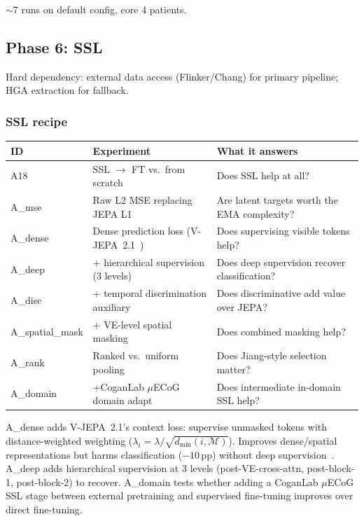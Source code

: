 \documentclass[11pt,letterpaper]{article}
\newcommand{\pp}{\,\text{pp}}
\begin{document}
${\sim}$7 runs on default config, core 4 patients.

\subsection{Phase 6: SSL}\label{sec:phase6}

\textcolor{BrickRed}{Hard dependency:} external data access (Flinker/Chang) for primary pipeline; HGA extraction for fallback.

\subsubsection{SSL recipe}

\begin{table}[ht!]\centering\small
\begin{tabular}{@{}llp{5.5cm}@{}}
\toprule
\textbf{ID} & \textbf{Experiment} & \textbf{What it answers} \\
\midrule
A18 & SSL $\to$ FT vs.\ from scratch & Does SSL help at all? \\
A\_mse & Raw L2 MSE replacing JEPA L1 & Are latent targets worth the EMA complexity? \\
A\_dense & Dense prediction loss (V-JEPA~2.1~\cite{bardes2026vjepa21}) & Does supervising visible tokens help? \\
A\_deep & + hierarchical supervision (3 levels) & Does deep supervision recover classification? \\
A\_disc & + temporal discrimination auxiliary & Does discriminative add value over JEPA? \\
A\_spatial\_mask & + VE-level spatial masking & Does combined masking help? \\
A\_rank & Ranked vs.\ uniform pooling & Does Jiang-style selection matter? \\
A\_domain & +CoganLab $\mu$ECoG domain adapt & Does intermediate in-domain SSL help? \\
\bottomrule
\end{tabular}
\end{table}

A\_dense adds V-JEPA~2.1's context loss: supervise unmasked tokens with distance-weighted weighting ($\lambda_i = \lambda / \sqrt{d_{\min}(i, \mathcal{M})}$). Improves dense/spatial representations but harms classification ($-10\pp$) without deep supervision~\cite{bardes2026vjepa21}. A\_deep adds hierarchical supervision at 3 levels (post-VE-cross-attn, post-block-1, post-block-2) to recover. A\_domain tests whether adding a CoganLab $\mu$ECoG SSL stage between external pretraining and supervised fine-tuning improves over direct fine-tuning.
\end{document}
